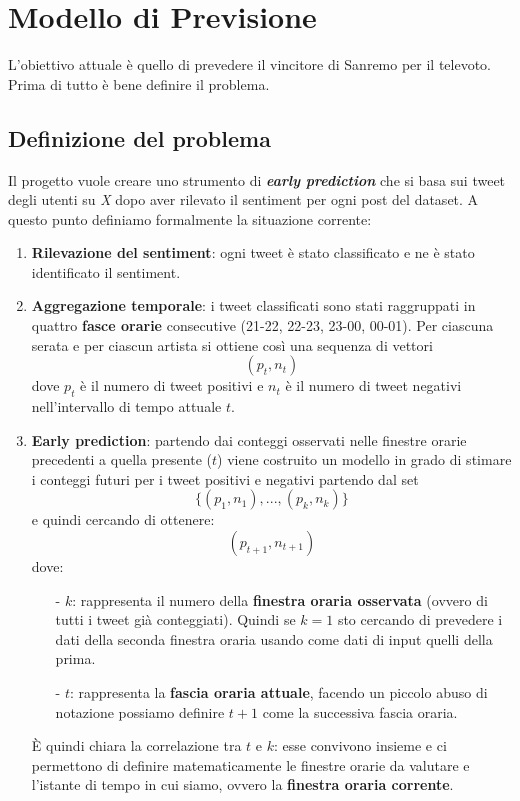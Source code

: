 \documentclass[a4paper,12pt]{article}
\begin{document}
\section{Modello di Previsione}
L'obiettivo attuale è quello di prevedere il vincitore di Sanremo per il televoto. Prima di tutto è bene definire il problema.

\subsection{Definizione del problema}
Il progetto vuole creare uno strumento di \textit{\textbf{early prediction}} che si basa sui tweet degli utenti su \textit{X} dopo aver rilevato il sentiment per ogni post del dataset. A questo punto definiamo formalmente la situazione corrente:
\begin{enumerate}
    \item \textbf{Rilevazione del sentiment}: ogni tweet è stato classificato e ne è stato identificato il sentiment.
    \item \textbf{Aggregazione temporale}: i tweet classificati sono stati raggruppati in quattro \textbf{fasce orarie} consecutive (21-22, 22-23, 23-00, 00-01). Per ciascuna serata e per ciascun artista si ottiene così una sequenza di vettori \[(p_t,n_t)\] dove \(p_t\) è il numero di tweet positivi e \(n_t\) è il numero di tweet negativi nell'intervallo di tempo attuale \(t\).
    \item \textbf{Early prediction}: partendo dai conteggi osservati nelle finestre orarie precedenti a quella presente (\(t\)) viene costruito un modello in grado di stimare i conteggi futuri per i tweet positivi e negativi partendo dal set \[\{(p_1,n_1),...,(p_k,n_k)\}\] e quindi cercando di ottenere: \[(p_{t+1},n_{t+1})\] dove:
    \begin{itemize}
        \item [-] \textbf{\(k\)}: rappresenta il numero della \textbf{finestra oraria osservata} (ovvero di tutti i tweet già conteggiati). Quindi se \(k=1\) sto cercando di prevedere i dati della seconda finestra oraria usando come dati di input quelli della prima.
        \item [-] \textbf{\(t\)}: rappresenta la \textbf{fascia oraria attuale}, facendo un piccolo abuso di notazione possiamo definire \(t+1\) come la successiva fascia oraria. 
    \end{itemize}
È quindi chiara la correlazione tra \(t\) e \(k\): esse convivono insieme e ci permettono di definire matematicamente le finestre orarie da valutare e l'istante di tempo in cui siamo, ovvero la \textbf{finestra oraria corrente}.
    
\end{enumerate} 
\end{document}
